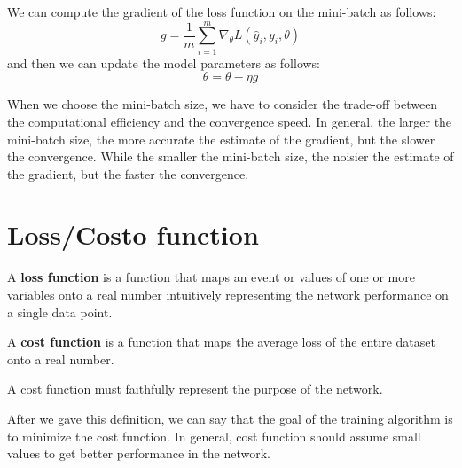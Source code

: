 We can compute the gradient of the loss function on the mini-batch as follows:
\begin{equation}
    g = \frac{1}{m} \sum_{i = 1}^{m} \nabla_{\theta} L(\hat{y}_i, y_i, \theta)
\end{equation}
and then we can update the model parameters as follows:
\begin{equation}
    \theta = \theta - \eta g
\end{equation}

When we choose the mini-batch size, we have to consider the trade-off between
the computational efficiency and the convergence speed. In general, the larger
the mini-batch size, the more accurate the estimate of the gradient, but the
slower the convergence. While the smaller the mini-batch size, the noisier the
estimate of the gradient, but the faster the convergence.
\section{Loss/Costo function}
\begin{definition}
    A \textbf{loss function} is a function that maps an event or values of one
    or more variables onto a real number intuitively representing the network
    performance on a single data point.
\end{definition}
\begin{definition}
    A \textbf{cost function} is a function that maps the average loss of the
    entire dataset onto a real number.

    A cost function must faithfully represent the purpose of the network.
\end{definition}

After we gave this definition, we can say that the goal of the training algorithm
is to minimize the cost function. In general, cost function should assume small
values to get better performance in the network.

